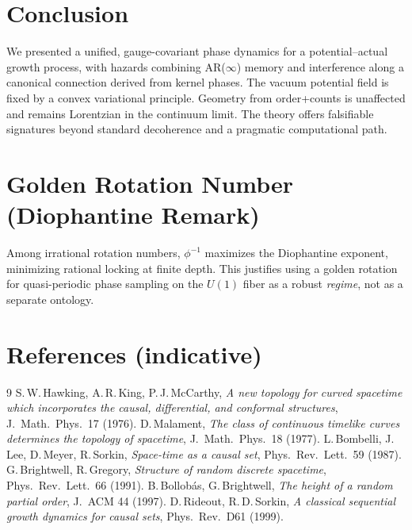 \documentclass[12pt,a4paper]{article}
\begin{document}
\section{Conclusion}

We presented a unified, gauge-covariant phase dynamics for a potential--actual growth process, with hazards combining AR($\infty$) memory and interference along a canonical connection derived from kernel phases. The vacuum potential field is fixed by a convex variational principle. Geometry from order+counts is unaffected and remains Lorentzian in the continuum limit. The theory offers falsifiable signatures beyond standard decoherence and a pragmatic computational path.

\appendix

\section{Golden Rotation Number (Diophantine Remark)}
Among irrational rotation numbers, $\phi^{-1}$ maximizes the Diophantine exponent, minimizing rational locking at finite depth. This justifies using a golden rotation for quasi-periodic phase sampling on the $U(1)$ fiber as a robust \emph{regime}, not as a separate ontology.

\section{References (indicative)}
\begin{thebibliography}{9}
 S.\,W.\,Hawking, A.\,R.\,King, P.\,J.\,McCarthy, \emph{A new topology for curved spacetime which incorporates the causal, differential, and conformal structures}, J.\ Math.\ Phys.\ 17 (1976).
 D.\,Malament, \emph{The class of continuous timelike curves determines the topology of spacetime}, J.\ Math.\ Phys.\ 18 (1977).
 L.\,Bombelli, J.\,Lee, D.\,Meyer, R.\,Sorkin, \emph{Space-time as a causal set}, Phys.\ Rev.\ Lett.\ 59 (1987).
 G.\,Brightwell, R.\,Gregory, \emph{Structure of random discrete spacetime}, Phys.\ Rev.\ Lett.\ 66 (1991).
 B.\,Bollob\'as, G.\,Brightwell, \emph{The height of a random partial order}, J.\ ACM 44 (1997).
 D.\,Rideout, R.\,D.\,Sorkin, \emph{A classical sequential growth dynamics for causal sets}, Phys.\ Rev.\ D61 (1999).
\end{thebibliography}
\end{document}
